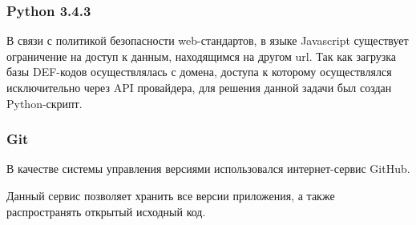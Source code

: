 \subsubsection{Python 3.4.3}

В связи с политикой безопасности web-стандартов\cite{mdncrossdomain}, в языке Javascript существует ограничение на доступ к данным, находящимся на другом url. Так как загрузка базы DEF-кодов осуществлялась с домена, доступа к которому осуществлялся исключительно через API провайдера, для решения данной задачи был создан Python-скрипт\cite{pythonoff}.

\subsubsection{Git}

В качестве системы управления версиями использовался интернет-сервис GitHub\cite{github}.

Данный сервис позволяет хранить все версии приложения, а также распространять открытый исходный код.


